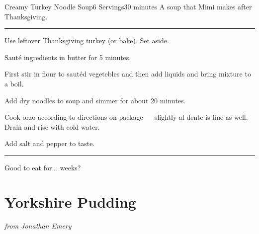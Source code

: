 \documentclass[openany]{book}
\begin{document}
\begin{recipe}{Creamy Turkey Noodle Soup}{6 Servings}{30 minutes} %
\freeform A soup that Mimi makes after Thanksgiving.       %
\freeform\rule{\textwidth}{0.05pt}                         %


Use leftover Thanksgiving turkey (or bake). Set aside.


Saut\'{e} ingredients in butter for 5 minutes.


First stir in flour to saut\'{e}d vegetebles and then add liquids and bring mixture to a boil.


Add dry noodles to soup and simmer for about 20 minutes.

Cook orzo according to directions on package --- slightly al dente is fine as well. Drain and rise with cold water.


Add salt and pepper to taste.

\freeform\rule{\textwidth}{0.05pt}

\freeform Good to eat for... weeks?

\end{recipe}

\chapter{Yorkshire Pudding}\label{yorkshire-pudding}

\emph{from Jonathan Emery}
\end{document}
